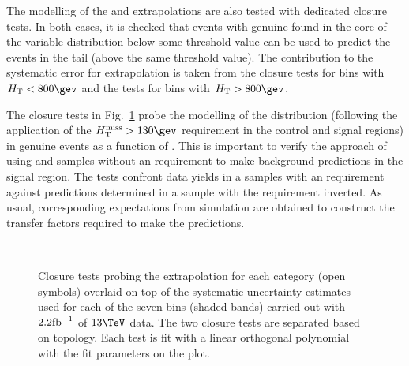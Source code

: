 The modelling of the \alphat and
\bdphi extrapolations are also tested with dedicated closure tests. In both
cases, it is checked that events with genuine \met found in the core
of the variable distribution below some threshold value can be used to
predict the events in the tail (above the same threshold value). The
contribution to the systematic error for \met extrapolation is taken
from the \alphat closure tests for bins with $\scalht<800\gev$ and
the \bdphi tests for bins with $\scalht>800\gev$.

The closure tests in Fig.~\ref{fig:closureAlphaT} probe the modelling
of the \alphat distribution (following the application of the $\mht >
130\gev$ requirement in the control and signal regions) in genuine
\met events as a function of \scalht. This is important to verify the
approach of using \mj and \mmj samples without an \alphat requirement
to make background predictions in the signal region. The tests
confront data yields in a \mj  samples with an \alphat
requirement against predictions determined in a \mj sample with
the \alphat requirement inverted. As usual, corresponding expectations
from simulation are obtained to construct the transfer factors
required to make the predictions.

\begin{figure}[h!]
  \begin{center}
    ~~
    \caption{Closure tests probing the \alphat extrapolation for each
      \njet category (open symbols) overlaid on top of the systematic
      uncertainty estimates used for each of the seven \scalht bins
      (shaded bands) carried out with $2.2\ifb$ of $13\tev$
      data. The two closure tests are separated based on topology.
      Each test is fit with a linear orthogonal polynomial with the
      fit parameters on the plot.}
    \label{fig:closureAlphaT}
  \end{center} 
\end{figure}

